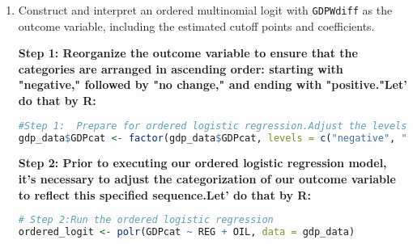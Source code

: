 \documentclass[12pt,letterpaper]{article}
\begin{document}
\begin{enumerate}
\textbf{Interpretation Summary:}

This model examines how regional effects (`REG`) and oil production/consumption impacts (`OIL`) influence the likelihood of a country's GDP changing positively or negatively compared to no change. The positive coefficients for `REG` and `OIL` across both "positive" and "negative" outcomes suggest that increases in these variables are associated with greater odds of observing both positive and negative changes in GDP compared to no change. This might reflect the complex and significant roles these factors play in economic dynamics, where they can contribute to both growth and decline under different circumstances.   

	\item Construct and interpret an ordered multinomial logit with \texttt{GDPWdiff} as the outcome variable, including the estimated cutoff points and coefficients.
 
\textbf{Step 1: Reorganize the outcome variable to ensure that the categories are arranged in ascending order: starting with "negative," followed by "no change," and ending with "positive."Let' do that by R:}
\begin{lstlisting}[language=R]
#Step 1:  Prepare for ordered logistic regression.Adjust the levels of the factor variable to establish a specific sequence.
gdp_data$GDPcat <- factor(gdp_data$GDPcat, levels = c("negative", "no change", "positive"))
\end{lstlisting}

\textbf{Step 2: Prior to executing our ordered logistic regression model, it's necessary to adjust the categorization of our outcome variable to reflect this specified sequence.Let' do that by R:}
\begin{lstlisting}[language=R]
# Step 2:Run the ordered logistic regression
ordered_logit <- polr(GDPcat ~ REG + OIL, data = gdp_data)


\end{lstlisting}
\end{enumerate}
\end{document}
